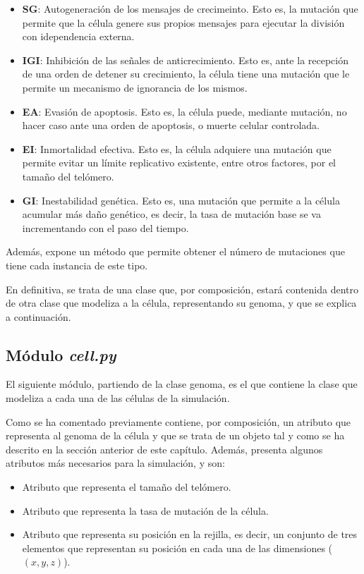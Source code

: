 \begin{itemize}
    \item \textbf{SG}: Autogeneración de los mensajes de crecimeinto. Esto es, la mutación que permite que la
    célula genere sus propios mensajes para ejecutar la división con idependencia externa.
    \item \textbf{IGI}: Inhibición de las señales de anticrecimiento. Esto es, ante la recepción de una orden
    de detener su crecimiento, la célula tiene una mutación que le permite un mecanismo de ignorancia de los mismos.
    \item \textbf{EA}: Evasión de apoptosis. Esto es, la célula puede, mediante mutación, no hacer caso ante
    una orden de apoptosis, o muerte celular controlada.
    \item \textbf{EI}: Inmortalidad efectiva. Esto es, la célula adquiere una mutación que permite evitar un límite
    replicativo existente, entre otros factores, por el tamaño del telómero.
    \item \textbf{GI}: Inestabilidad genética. Esto es, una mutación que permite a la célula acumular más daño genético, es decir,
    la tasa de mutación base se va incrementando con el paso del tiempo.
\end{itemize}

Además, expone un método que permite obtener el número de mutaciones que tiene cada instancia
de este tipo.

En definitiva, se trata de una clase que, por composición, estará contenida dentro de otra clase
que modeliza a la célula, representando su genoma, y que se explica a continuación.

\subsection{Módulo \textit{cell.py}}

El siguiente módulo, partiendo de la clase genoma, es el que contiene la clase que modeliza
a cada una de las células de la simulación.

Como se ha comentado previamente contiene, por composición, un atributo que representa
al genoma de la célula y que se trata de un objeto tal y como se ha descrito en la sección anterior de este capítulo.
Además, presenta algunos atributos más necesarios para la simulación, y son:

\begin{itemize}
    \item Atributo que representa el tamaño del telómero.
    \item Atributo que representa la tasa de mutación de la célula.
    \item Atributo que representa su posición en la rejilla, es decir, un conjunto de tres elementos
    que representan su posición en cada una de las dimensiones ($(x,y,z)$).
\end{itemize}

